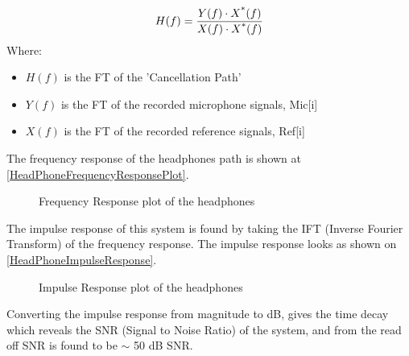 \begin{equation}\label{FrequencyResponseEq2}
H(f) = \frac{Y(f) \cdot X\textsuperscript{*}(f)}{X(f) \cdot X\textsuperscript{*}(f)}
\end{equation}
Where:
\begin{itemize}
	\item $H(f)$ is the FT of the 'Cancellation Path'
	\item $Y(f)$ is the FT of the recorded microphone signals, Mic[i]
	\item $X(f)$ is the FT of the recorded reference signals, Ref[i]
\end{itemize}


The frequency response of the headphones path is shown at \autoref{HeadPhoneFrequencyResponsePlot}.

\begin{figure}[H]
	\centering
	
	\caption{Frequency Response plot of the headphones}
	\label{HeadPhoneFrequencyResponsePlot}
\end{figure}



The impulse response of this system is found by taking the IFT (Inverse Fourier Transform) of the frequency response.
The impulse response looks as shown on \autoref{HeadPhoneImpulseResponse}.


\begin{figure}[H]
	\centering
	
	\caption{Impulse Response plot of the headphones }
	\label{HeadPhoneImpulseResponse}
\end{figure}

%	

Converting the impulse response from magnitude to dB, gives the time decay which reveals the SNR (Signal to Noise Ratio) of the system, and from the read off SNR is found to be $\sim$ 50 dB SNR.


